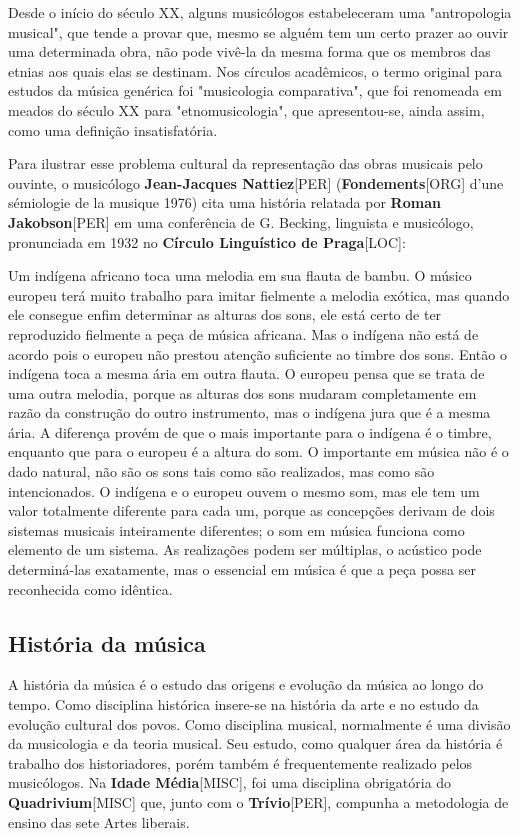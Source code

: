 \documentclass[a4paper,12pt]{article}
\begin{document}
Desde o início do século XX, alguns musicólogos estabeleceram uma "antropologia musical", que tende a provar que, mesmo se alguém tem um certo prazer ao ouvir uma determinada obra, não pode vivê-la da mesma forma que os membros das etnias aos quais elas se destinam. Nos círculos acadêmicos, o termo original para estudos da música genérica foi "musicologia comparativa", que foi renomeada em meados do século XX para "etnomusicologia", que apresentou-se, ainda assim, como uma definição insatisfatória.

Para ilustrar esse problema cultural da representação das obras musicais pelo ouvinte, o musicólogo \textbf{Jean-Jacques Nattiez}\textsc{[PER]} (\textbf{Fondements}\textsc{[ORG]} d'une sémiologie de la musique 1976) cita uma história relatada por \textbf{Roman Jakobson}\textsc{[PER]} em uma conferência de G. Becking, linguista e musicólogo, pronunciada em 1932 no \textbf{Círculo Linguístico de Praga}\textsc{[LOC]}:

Um indígena africano toca uma melodia em sua flauta de bambu. O músico europeu terá muito trabalho para imitar fielmente a melodia exótica, mas quando ele consegue enfim determinar as alturas dos sons, ele está certo de ter reproduzido fielmente a peça de música africana. Mas o indígena não está de acordo pois o europeu não prestou atenção suficiente ao timbre dos sons. Então o indígena toca a mesma ária em outra flauta. O europeu pensa que se trata de uma outra melodia, porque as alturas dos sons mudaram completamente em razão da construção do outro instrumento, mas o indígena jura que é a mesma ária. A diferença provém de que o mais importante para o indígena é o timbre, enquanto que para o europeu é a altura do som. O importante em música não é o dado natural, não são os sons tais como são realizados, mas como são intencionados. O indígena e o europeu ouvem o mesmo som, mas ele tem um valor totalmente diferente para cada um, porque as concepções derivam de dois sistemas musicais inteiramente diferentes; o som em música funciona como elemento de um sistema. As realizações podem ser múltiplas, o acústico pode determiná-las exatamente, mas o essencial em música é que a peça possa ser reconhecida como idêntica.

\subsection*{História da música}
A história da música é o estudo das origens e evolução da música ao longo do tempo. Como disciplina histórica insere-se na história da arte e no estudo da evolução cultural dos povos. Como disciplina musical, normalmente é uma divisão da musicologia e da teoria musical. Seu estudo, como qualquer área da história é trabalho dos historiadores, porém também é frequentemente realizado pelos musicólogos. Na \textbf{Idade Média}\textsc{[MISC]}, foi uma disciplina obrigatória do \textbf{Quadrivium}\textsc{[MISC]} que, junto com o \textbf{Trívio}\textsc{[PER]}, compunha a metodologia de ensino das sete Artes liberais.
\end{document}
